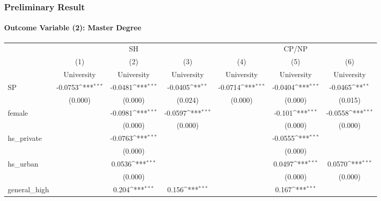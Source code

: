 \documentclass{beamer}
\def\sym#1{\ifmmode^{#1}\else\(^{#1}\)\fi}
\begin{document}
\begin{frame}[shrink=38] %
\frametitle{Preliminary Result}
\framesubtitle{Outcome Variable (2): Master Degree}

\centering
\begin{tabular}{l*{6}c}
    \toprule
    &\multicolumn{3}{c}{SH} &\multicolumn{3}{c}{CP/NP} \\
    \cmidrule(l){2-4}\cmidrule(l){5-7}
    &\multicolumn{1}{c}{(1)}&\multicolumn{1}{c}{(2)}&\multicolumn{1}{c}{(3)}&\multicolumn{1}{c}{(4)}&\multicolumn{1}{c}{(5)}&\multicolumn{1}{c}{(6)} \\
    &\multicolumn{1}{c}{University}&\multicolumn{1}{c}{University}&\multicolumn{1}{c}{University}&\multicolumn{1}{c}{University}&\multicolumn{1}{c}{University}&\multicolumn{1}{c}{University} \\
    \midrule
    SP          &     -0.0753\sym{***}&     -0.0481\sym{***}&     -0.0405\sym{**} &     -0.0714\sym{***}&     -0.0404\sym{***}&     -0.0465\sym{**} \\
                &     (0.000)         &     (0.000)         &     (0.024)         &     (0.000)         &     (0.000)         &     (0.015)         \\
    [1em]
    female      &                     &     -0.0981\sym{***}&     -0.0597\sym{***}&                     &      -0.101\sym{***}&     -0.0558\sym{***}\\
                &                     &     (0.000)         &     (0.000)         &                     &     (0.000)         &     (0.000)         \\
    [1em]
    hs\_private  &                     &     -0.0763\sym{***}&                     &                     &     -0.0555\sym{***}&                     \\
                &                     &     (0.000)         &                     &                     &     (0.000)         &                     \\
    [1em]
    hs\_urban    &                     &      0.0536\sym{***}&                     &                     &      0.0497\sym{***}&      0.0570\sym{***}\\
                &                     &     (0.000)         &                     &                     &     (0.000)         &     (0.000)         \\
    [1em]
    general\_high&                     &       0.204\sym{***}&       0.156\sym{***}&                     &       0.167\sym{***}&                     \\

\end{tabular}
\end{frame}
\end{document}

